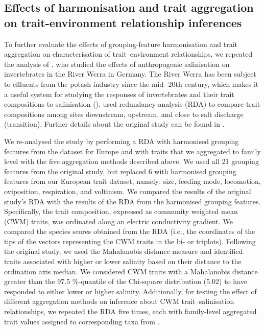 \documentclass{article}
\begin{document}
\newpage


\subsection*{Effects of harmonisation and trait aggregation on trait-environment relationship inferences}

To further evaluate the effects of grouping-feature harmonisation and trait aggregation on characterisation of trait–environment relationships, we repeated the analysis of \citet{szocs_effects_2014}, who studied the effects of anthropogenic salinisation on invertebrates in the River Werra in Germany. The River Werra has been subject to effluents from the potash industry since the mid- 20th century, which makes it a useful system for studying the responses of invertebrates and their trait compositions to salinisation (\cite{bathe_biological_2011}). \citet{szocs_effects_2014}  used redundancy analysis (RDA) to compare trait compositions among sites downstream, upstream, and close to salt discharge (transition). Further details about the original study can be found in \citet{szocs_effects_2014}.

We re-analysed the \citet{szocs_effects_2014} study by performing a RDA with harmonised grouping features from the dataset for Europe and with traits that we aggregated to family level with the five aggregation methods described above. We used all 21 grouping features from the original study, but replaced 6 with harmonised grouping features from our European trait dataset, namely: size, feeding mode, locomotion, oviposition, respiration, and voltinism.
We compared the results of the original study’s RDA with the results of the RDA from the harmonised grouping features. Specifically, the trait composition, expressed as community weighted mean (CWM) traits, was ordinated along an electric conductivity gradient. We compared the species scores obtained from the RDA (i.e., the coordinates of the tips of the vectors representing the CWM traits in the bi- or triplots). Following the original study, we used the Mahalanobis distance measure and identified traits associated with higher or lower salinity based on their distance to the ordination axis median. We considered CWM traits with a Mahalanobis distance greater than the 97.5 \%-quantile of the Chi-square distribution (5.02) to have responded to either lower or higher salinity. Additionally, for testing the effect of different aggregation methods on inference about CWM trait–salinisation relationships, we repeated the RDA five times, each with family-level aggregated trait values assigned to corresponding taxa from \citet{szocs_effects_2014}.
\end{document}
